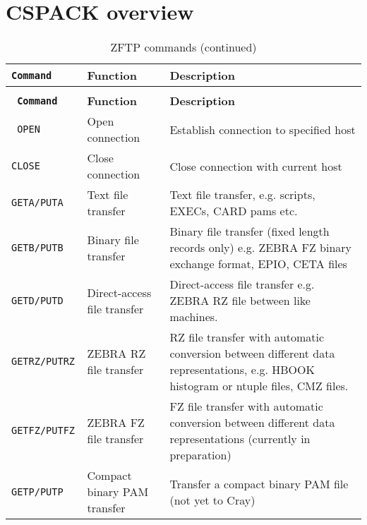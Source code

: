 \chapter{CSPACK overview}
\begin{longtable}{|>{\tt}p{}|p{}|p{}|}
\caption[ZFTP commands]{ZFTP commands\label{tab:ZFTPCOM2}}\\
\hline
\rm\bf Command     & \rm\bf Function             &\rm\bf Description          \\
\hline
\endfirsthead
\caption[]{ZFTP commands (continued)}\\
\hline
\rm\bf Command     & \rm\bf Function             &\rm\bf Description          \\
\hline
\endhead
\hline
\endfoot
\tt OPEN         & Open connection             &
   Establish connection to specified host                                     \\
\tt CLOSE        & Close connection            &
   Close connection with current host                                         \\
\tt GETA/PUTA    & Text file transfer          &
   Text file transfer, e.g. scripts, EXECs, CARD pams etc.                    \\
\tt GETB/PUTB    & Binary file transfer        &
   Binary file transfer (fixed length records only)
   e.g. ZEBRA FZ binary exchange format, EPIO, CETA files                     \\
\tt GETD/PUTD    & Direct-access file transfer &
   Direct-access file transfer
   e.g. ZEBRA RZ file between like machines.                                  \\
\tt GETRZ/PUTRZ  & ZEBRA RZ file transfer      &
   RZ file transfer with automatic conversion between different
   data representations,
   e.g. HBOOK histogram or ntuple files, CMZ files.                           \\
\tt GETFZ/PUTFZ  & ZEBRA FZ file transfer      &
   FZ file transfer with automatic conversion between different
   data representations (currently in preparation)                            \\
\tt GETP/PUTP    & Compact binary PAM transfer &
   Transfer a compact binary PAM file (not yet to Cray)                       \\

\end{longtable}
